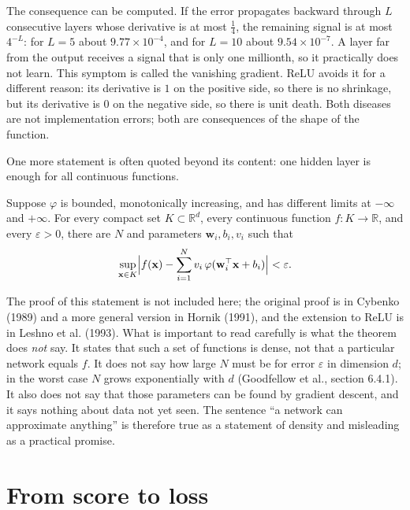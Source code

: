 The consequence can be computed. If the error propagates backward through $L$ consecutive layers
whose derivative is at most $\tfrac14$, the remaining signal is at most $4^{-L}$: for $L=5$ about
$9.77\times10^{-4}$, and for $L=10$ about $9.54\times10^{-7}$. A layer far from the output
receives a signal that is only one millionth, so it practically does not learn. This symptom is
called the vanishing gradient. ReLU avoids it for a different reason: its derivative is $1$ on
the positive side, so there is no shrinkage, but its derivative is $0$ on the negative side, so
there is unit death. Both diseases are not implementation errors; both are consequences of the
shape of the function.

One more statement is often quoted beyond its content: one hidden layer is enough for all
continuous functions.

\begin{teorema}
Suppose $\varphi$ is bounded, monotonically increasing, and has different limits at $-\infty$
and $+\infty$. For every compact set $K\subset\mathbb{R}^{d}$, every continuous function
$f:K\to\mathbb{R}$, and every $\varepsilon>0$, there are $N$ and parameters
$\mathbf{w}_{i},b_{i},v_{i}$ such that
\[
  \sup_{\mathbf{x}\in K}\Bigl|f(\mathbf{x})-\sum_{i=1}^{N}v_{i}\,
  \varphi(\mathbf{w}_{i}^{\top}\mathbf{x}+b_{i})\Bigr|<\varepsilon .
\]
\end{teorema}

The proof of this statement is not included here; the original proof is in Cybenko (1989) and a
more general version in Hornik (1991), and the extension to ReLU is in Leshno et al. (1993).
What is important to read carefully is what the theorem does \emph{not} say. It states that such
a set of functions is dense, not that a particular network equals $f$. It does not say how large
$N$ must be for error $\varepsilon$ in dimension $d$; in the worst case $N$ grows exponentially
with $d$ (Goodfellow et al., section 6.4.1). It also does not say that those parameters can be
found by gradient descent, and it says nothing about data not yet seen. The sentence ``a network
can approximate anything'' is therefore true as a statement of density and misleading as a
practical promise.

\section{From score to loss}

